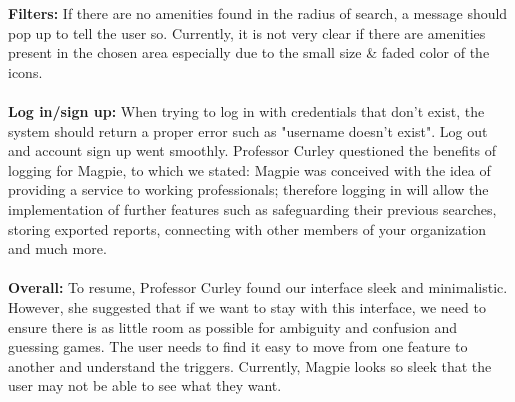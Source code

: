 \documentclass{report}
\begin{document}
\textbf{Filters: }
If there are no amenities found in the radius of search, a message should pop up to tell the user so. Currently, it is not very clear if there are amenities present in the chosen area especially due to the small size \& faded color of the icons. \\ \\
\textbf{Log in/sign up: }
When trying to log in with credentials that don't exist, the system should return a proper error such as "username doesn't exist". Log out and account sign up went smoothly. Professor Curley questioned the benefits of logging for Magpie, to which we stated:
Magpie was conceived with the idea of providing a service to working professionals; therefore logging in will allow the implementation of further features such as safeguarding their previous searches, storing exported reports, connecting with other members of your organization and much more.\\ \\
\textbf{Overall: }
To resume, Professor Curley found our interface sleek and minimalistic. However, she suggested that if we want to stay with this interface, we need to ensure there is as little room as possible for ambiguity and confusion and guessing games. The user needs to find it easy to move from one feature to another and understand the triggers. Currently, Magpie looks so sleek that the user may not be able to see what they want.\\ \\
\end{document}

